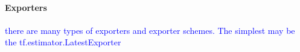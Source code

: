 



\paragraph{Exporters}

\textcolor{blue}{there are many types of exporters and exporter schemes. The simplest may be the tf.estimator.LatestExporter}


